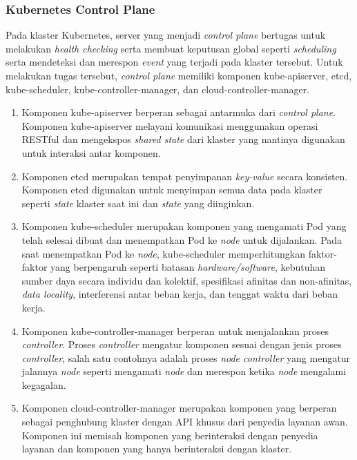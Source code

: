 \subsubsection{Kubernetes Control Plane}

Pada klaster Kubernetes, server yang menjadi \emph{control plane} bertugas
untuk melakukan \emph{health checking} serta membuat keputusan global seperti \emph{scheduling}
serta mendeteksi dan merespon \emph{event} yang terjadi pada klaster tersebut. Untuk melakukan
tugas tersebut, \emph{control plane} memiliki komponen kube-apiserver,
etcd, kube-scheduler, kube-controller-manager, dan cloud-controller-manager.

\begin{enumerate}
  
  \item Komponen kube-apiserver berperan sebagai antarmuka dari \emph{control plane}.
    Komponen kube-apiserver melayani komunikasi menggunakan operasi RESTful dan
    mengekspos \emph{shared state} dari klaster yang nantinya digunakan untuk
    interaksi antar komponen.

  \item Komponen etcd merupakan tempat penyimpanan \emph{key-value} secara konsisten.
    Komponen etcd digunakan untuk menyimpan semua data pada klaster seperti \emph{state}
    klaster saat ini dan \emph{state} yang diinginkan.

  \item Komponen kube-scheduler merupakan komponen yang mengamati Pod yang telah
    selesai dibuat dan menempatkan Pod ke \emph{node} untuk dijalankan. Pada saat
    menempatkan Pod ke \emph{node}, kube-scheduler memperhitungkan faktor-faktor
    yang berpengaruh seperti batasan \emph{hardware/software}, kebutuhan sumber daya secara
    individu dan kolektif, spesifikasi afinitas dan non-afinitas, \emph{data locality}, interferensi
    antar beban kerja, dan tenggat waktu dari beban kerja.

  \item Komponen kube-controller-manager berperan untuk menjalankan proses \emph{controller}.
    Proses \emph{controller} mengatur komponen sesuai dengan jenis proses \emph{controller},
    salah satu contohnya adalah proses \emph{node controller} yang mengatur jalannya \emph{node}
    seperti mengamati \emph{node} dan merespon ketika \emph{node} mengalami kegagalan.

  \item Komponen cloud-controller-manager merupakan komponen yang berperan sebagai penghubung
    klaster dengan API khusus dari penyedia layanan awan. Komponen ini memisah
    komponen yang berinteraksi dengan penyedia layanan dan komponen yang hanya berinteraksi dengan
    klaster.

\end{enumerate}

